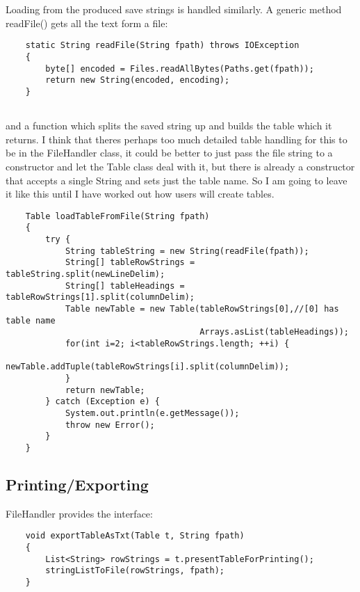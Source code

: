 \documentclass[11pt]{article} %
\begin{document}
Loading from the produced save strings is handled similarly. A generic method readFile() gets all the text form a file:

\begin{lstlisting}
    static String readFile(String fpath) throws IOException
    {
        byte[] encoded = Files.readAllBytes(Paths.get(fpath));
        return new String(encoded, encoding);
    }
    
\end{lstlisting}

and a function which splits the saved string up and builds the table which it returns. I think that theres perhaps too much detailed table handling for this to be in the FileHandler class, it could be better to just pass the file string to a constructor and let the Table class deal with it, but there is already a constructor that accepts a single String and sets just the table name. So I am going to leave it like this until I have worked out how users will create tables.

\begin{lstlisting}
    Table loadTableFromFile(String fpath)
    {
        try {
            String tableString = new String(readFile(fpath));
            String[] tableRowStrings = tableString.split(newLineDelim);
            String[] tableHeadings = tableRowStrings[1].split(columnDelim);
            Table newTable = new Table(tableRowStrings[0],//[0] has table name
                                       Arrays.asList(tableHeadings));
            for(int i=2; i<tableRowStrings.length; ++i) {
                newTable.addTuple(tableRowStrings[i].split(columnDelim));
            }
            return newTable;
        } catch (Exception e) {
            System.out.println(e.getMessage());
            throw new Error();
        }
    }

\end{lstlisting}




\subsection{Printing/Exporting}

FileHandler provides the interface:


\begin{lstlisting}
    void exportTableAsTxt(Table t, String fpath)
    {
        List<String> rowStrings = t.presentTableForPrinting();
        stringListToFile(rowStrings, fpath);
    }
\end{lstlisting}
\end{document}
